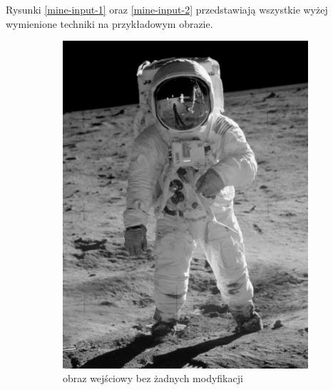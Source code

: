 \documentclass[a4paper, 12pt, polish, twoside]{extreport}
\begin{document}
    Rysunki \ref{mine-input-1} oraz \ref{mine-input-2} przedstawiają wszystkie wyżej wymienione techniki na przykładowym obrazie.
    \begin{figure}[H] 
        \centering
        \begin{subfigure}{0.49\textwidth}
            \centering
            \includegraphics[width = \textwidth]{img/4-mine/input-input.png}
            \caption{obraz wejściowy bez żadnych modyfikacji}
            \label{mine-input-1-a}
        \end{subfigure}
        \begin{subfigure}{0.49\textwidth}
            \centering

\end{subfigure}
\end{figure}
\end{document}
